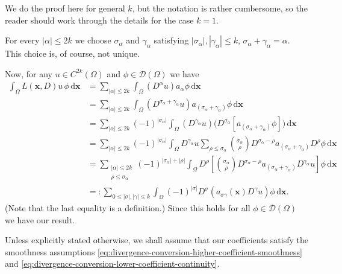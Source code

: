 \begin{Proof}
We do the proof here for general $k$, but the notation is rather cumbersome, so the reader should work through the details for the case $k=1$.

For every $|\alpha|\leq2k$ we choose $\sigma_\alpha$ and $\gamma_\alpha$ satisfying $|\sigma_\alpha|,|\gamma_\alpha|\leq k$, $\sigma_\alpha+\gamma_\alpha=\alpha$. This choice is, of course, not unique.

Now, for any $u\in C^{2k}(\Omega)$ and $\phi\in\mathcal{D}(\Omega)$ we have\[\begin{aligned}
\int_\Omega L(\bm{x},D)u\,\phi\,\mathrm{d}\bm{x}
&=\sum_{|\alpha|\leq2k}\int_\Omega(D^\alpha u)a_\alpha\phi\,\mathrm{d}\bm{x}\\
&=\sum_{|\alpha|\leq2k}\int_\Omega(D^{\sigma_\alpha+\gamma_\alpha}u)a_{(\sigma_\alpha+\gamma_\alpha)}\phi\,\mathrm{d}\bm{x}\\
&=\sum_{|\alpha|\leq2k}(-1)^{|\sigma_\alpha|}\int_\Omega(D^{\gamma_\alpha}u)\bigl(D^{\sigma_\alpha}[a_{(\sigma_\alpha+\gamma_\alpha)}\phi]\bigr)\,\mathrm{d}\bm{x}\\
&=\sum_{|\alpha|\leq2k}(-1)^{|\sigma_\alpha|}\int_\Omega D^{\gamma_\alpha}u
\sum_{\rho\leq\sigma_\alpha}\binom{\sigma_\alpha}{\rho}D^{\sigma_\alpha-\rho}a_{(\sigma_\alpha+\gamma_\alpha)}D^\rho\phi\,\mathrm{d}\bm{x}\\
&=\sum_{\substack{|\alpha|\leq2k\\\rho\leq\sigma_\alpha}}(-1)^{|\sigma_\alpha|+|\rho|}\int_\Omega
D^\rho\left[\binom{\sigma_\alpha}{\rho}D^{\sigma_\alpha-\rho}a_{(\sigma_\alpha+\gamma_\alpha)}D^{\gamma_\alpha}u\right]\phi\,\mathrm{d}\bm{x}\\
&=: \sum_{0\leq|\sigma|,|\gamma|\leq k}\int_\Omega(-1)^{|\sigma|}D^\sigma(a_{\sigma\gamma}(\bm{x})D^\gamma u)\phi\,\mathrm{d}\bm{x}.
\end{aligned}\](Note that the last equality is a definition.) Since this holds for all $\phi\in\mathcal{D}(\Omega)$ we have our result.
\end{Proof}

\begin{Remark}
\label{rem:standing-elliptic-coefficient-smoothness}
Unless explicitly stated otherwise, we shall assume that our coefficients satisfy the smoothness assumptions \eqref{eq:divergence-conversion-higher-coefficient-smoothness} and \eqref{eq:divergence-conversion-lower-coefficient-continuity}.
\end{Remark}

